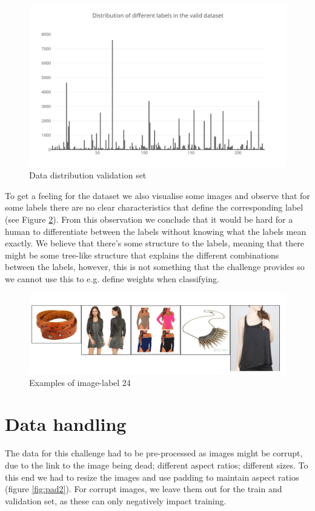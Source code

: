 \documentclass[twocolumn]{article}
\begin{document}
        \begin{figure}
            \centering
            \includegraphics[scale=.4]{img/dist_labels_validation.PNG}
            \caption{Data distribution validation set}
            \label{fig:data_dist_val}
        \end{figure}
        To get a feeling for the dataset we also visualise some images and observe that for some labels there are no clear characteristics that define the corresponding label (see Figure \ref{fig:img_example}). From this observation we conclude that it would be hard for a human to differentiate between the labels without knowing what the labels mean exactly. We believe that there's some structure to the labels, meaning that there might be some tree-like structure that explains the different combinations between the labels, however, this is not something that the challenge provides so we cannot use this to e.g. define weights when classifying.
        \begin{figure}
            \centering
            \includegraphics[scale=.25]{img/label_24.jpg}
            \caption{Examples of image-label 24}
            \label{fig:img_example}
        \end{figure}
	
		\section{Data handling}
		The data for this challenge had to be pre-processed as images might be corrupt, due to the link to the image being dead; different aspect ratios; different sizes. To this end we had to resize the images and use padding to maintain aspect ratios (figure \ref{fig:pad2}). For corrupt images, we leave them out for the train and validation set, as these can only negatively impact training.
        
\end{document}
